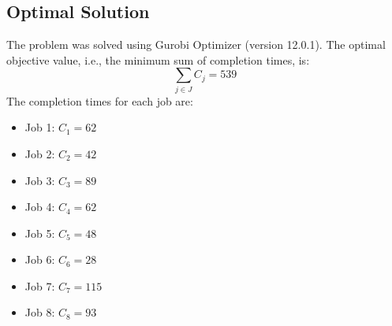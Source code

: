 \documentclass{article}
\begin{document}
\subsection*{Optimal Solution}
The problem was solved using Gurobi Optimizer (version 12.0.1). The optimal objective value, i.e., the minimum sum of completion times, is:
\[
\sum_{j \in J} C_j = 539
\]
The completion times for each job are:
\begin{itemize}
    \item Job 1: $C_1 = 62$
    \item Job 2: $C_2 = 42$
    \item Job 3: $C_3 = 89$
    \item Job 4: $C_4 = 62$
    \item Job 5: $C_5 = 48$
    \item Job 6: $C_6 = 28$
    \item Job 7: $C_7 = 115$
    \item Job 8: $C_8 = 93$
\end{itemize}
\end{document}
